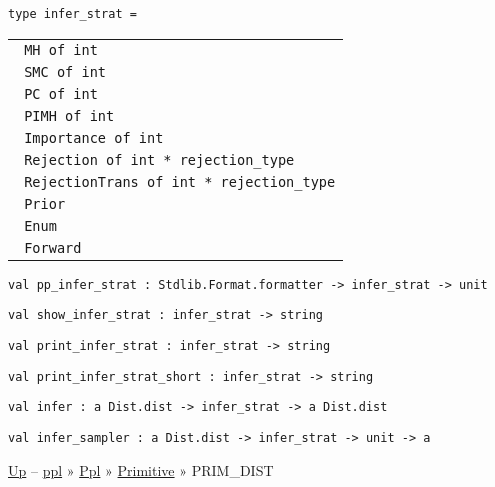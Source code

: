 \protect\hyperlink{type-inferux5fstrat}{}\texttt{type\ infer\_strat}\texttt{\ =\ }

\begin{longtable}[c]{@{}l@{}}
\toprule
\protect\hyperlink{type-inferux5fstrat.MH}{}\texttt{\textbar{}\ }\texttt{MH\ of\ int}\tabularnewline
\protect\hyperlink{type-inferux5fstrat.SMC}{}\texttt{\textbar{}\ }\texttt{SMC\ of\ int}\tabularnewline
\protect\hyperlink{type-inferux5fstrat.PC}{}\texttt{\textbar{}\ }\texttt{PC\ of\ int}\tabularnewline
\protect\hyperlink{type-inferux5fstrat.PIMH}{}\texttt{\textbar{}\ }\texttt{PIMH\ of\ int}\tabularnewline
\protect\hyperlink{type-inferux5fstrat.Importance}{}\texttt{\textbar{}\ }\texttt{Importance\ of\ int}\tabularnewline
\protect\hyperlink{type-inferux5fstrat.Rejection}{}\texttt{\textbar{}\ }\texttt{Rejection\ of\ int\ *\ rejection\_type}\tabularnewline
\protect\hyperlink{type-inferux5fstrat.RejectionTrans}{}\texttt{\textbar{}\ }\texttt{RejectionTrans\ of\ int\ *\ rejection\_type}\tabularnewline
\protect\hyperlink{type-inferux5fstrat.Prior}{}\texttt{\textbar{}\ }\texttt{Prior}\tabularnewline
\protect\hyperlink{type-inferux5fstrat.Enum}{}\texttt{\textbar{}\ }\texttt{Enum}\tabularnewline
\protect\hyperlink{type-inferux5fstrat.Forward}{}\texttt{\textbar{}\ }\texttt{Forward}\tabularnewline
\bottomrule
\end{longtable}

\protect\hyperlink{val-ppux5finferux5fstrat}{}\texttt{val\ pp\_infer\_strat\ :\ Stdlib.Format.formatter\ -\textgreater{}\ infer\_strat\ -\textgreater{}\ unit}

\protect\hyperlink{val-showux5finferux5fstrat}{}\texttt{val\ show\_infer\_strat\ :\ infer\_strat\ -\textgreater{}\ string}

\protect\hyperlink{val-printux5finferux5fstrat}{}\texttt{val\ print\_infer\_strat\ :\ infer\_strat\ -\textgreater{}\ string}

\protect\hyperlink{val-printux5finferux5fstratux5fshort}{}\texttt{val\ print\_infer\_strat\_short\ :\ infer\_strat\ -\textgreater{}\ string}

\protect\hyperlink{val-infer}{}\texttt{val\ infer\ :\ \textquotesingle{}a\ Dist.dist\ -\textgreater{}\ infer\_strat\ -\textgreater{}\ \textquotesingle{}a\ Dist.dist}

\protect\hyperlink{val-inferux5fsampler}{}\texttt{val\ infer\_sampler\ :\ \textquotesingle{}a\ Dist.dist\ -\textgreater{}\ infer\_strat\ -\textgreater{}\ unit\ -\textgreater{}\ \textquotesingle{}a}

\href{../index.html}{Up} -- \href{../../../index.html}{ppl} »
\href{../../index.html}{Ppl} » \href{../index.html}{Primitive} »
PRIM\_DIST

